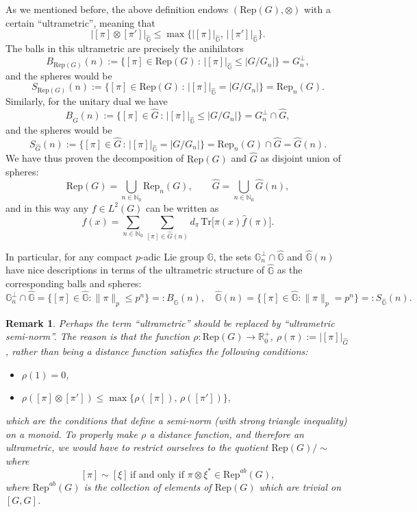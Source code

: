 \documentclass[12pt, reqno]{amsart}
\newtheorem{rem}[defi]{Remark}
\newcommand{\R}{\mathbb{R}}
\newcommand{\1}{\mathds{1}}
\newcommand{\G}{\mathbb{G}}
\begin{document}
As we mentioned before, the above definition endows $(\mathrm{Rep}(G), \otimes)$ with a certain ``ultrametric'', meaning that $$| [\pi] \otimes [\pi'] |_{\widehat{\G}} \leq  \max \{| [\pi] |_{\widehat{\G}}, \, | [\pi'] |_{\widehat{\G}}\}.$$ 
The balls in this ultrametric are precisely the anihilators $$B_{ \mathrm{Rep}(G)} (n):= \{[\pi ] \in \mathrm{Rep}(G) \, : \, | [\pi]  |_{\widehat{\G}} \leq |G/G_n| \}= G_n^\bot,$$and the spheres would be $$S_{ \mathrm{Rep}(G)} (n):= \{[\pi ] \in \mathrm{Rep}(G) \, : \, | [\pi] |_{\widehat{\G}} = |G/G_n| \}= \mathrm{Rep}_n (G).$$Similarly, for the unitary dual we have$$B_{ \widehat{G}} (n):= \{[\pi ] \in \widehat{G} \, : \, | [\pi] |_{\widehat{\G}} \leq |G/G_n| \}= G_n^\bot \cap \widehat{G},$$and the spheres would be $$S_{ \widehat{G}} (n):= \{[\pi ] \in \widehat{G} \, : \, | [\pi]  |_{\widehat{\G}} = |G/G_n| \}= \mathrm{Rep}_n (G) \cap \widehat{G} = \widehat{G}(n).$$
We have thus proven the decomposition of $\mathrm{Rep}(G)$ and $\widehat{G}$ as disjoint union of spheres:
\[
\mathrm{Rep}(G) = \bigcup_{n \in \mathbb{N}_0} \mathrm{Rep}_n(G), 
\qquad 
\widehat{G} = \bigcup_{n \in \mathbb{N}_0} \widehat{G}(n),
\]
and in this way any $f \in L^2(G)$ can be written as
\[
f(x) = \sum_{n \in \mathbb{N}_0} \sum_{[\pi] \in \widehat{G}(n)} d_\pi \,\mathrm{Tr} \big[ \pi(x) \widehat{f}(\pi) \big].
\]


In particular, for any compact $p$-adic Lie group $\G$, the sets $\G_n^\perp \cap \widehat{\mathbb{G}}$ and $\widehat{\mathbb{G}}(n)$ have nice descriptions in terms of the ultrametric structure of $\widehat{\G}$ as the corresponding balls and spheres:
\[
\G_n^\perp \cap \widehat{\mathbb{G}} = \{ [\pi] \in \widehat{\mathbb{G}} : \|\pi\|_p \le p^n \} =: B_{\widehat{\mathbb{G}}}(n), 
\quad 
\widehat{\mathbb{G}}(n) = \{ [\pi] \in \widehat{\mathbb{G}} : \|\pi\|_p = p^n \} =: S_{\widehat{\mathbb{G}}}(n).
\]



\begin{rem}\label{remultrametricisnotdistance}
Perhaps the term ``ultrametric'' should be replaced by ``ultrametric semi-norm''. The reason is that the function $\rho : \mathrm{Rep}(G) \to \R_0^+$, $\rho(\pi):= |[\pi]|_{\widehat{G}}$, rather than being a distance function satisfies the following conditions: 
\begin{itemize}
    \item $\rho(1)=0$,
    \item $\rho([ \pi] \otimes [\pi' ]) \leq \max \{  \rho ([ \pi]) , \, \rho ([ \pi'])\},$
\end{itemize}
which are the conditions that define a semi-norm (with strong triangle inequality) on a monoid. To properly make $\rho$ a distance function, and therefore an ultrametric, we would have to restrict ourselves to the quotient $\mathrm{Rep}(G)/ \sim$ where $$[\pi] \sim [\xi] \, \text{if and only if} \,  \, \pi \otimes \xi^* \in \mathrm{Rep}^{ab}(G),$$where $\mathrm{Rep}^{ab}(G)$ is the collection of elements of $\mathrm{Rep}(G)$ which are trivial on $[G,G]$. 
\end{rem}
\end{document}
